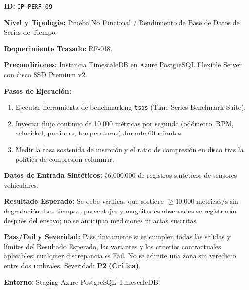\par\noindent\textbf{ID:} \texttt{C\allowbreak{}P\allowbreak{}-\allowbreak{}P\allowbreak{}E\allowbreak{}R\allowbreak{}F\allowbreak{}-\allowbreak{}0\allowbreak{}9\allowbreak{}}\par
\par\noindent\textbf{Nivel y Tipología:} Prueba No Funcional / Rendimiento de Base de Datos de Series de Tiempo.\par
\par\noindent\textbf{Requerimiento Trazado:} RF-018.\par
\par\noindent\textbf{Precondiciones:} Instancia TimescaleDB en Azure PostgreSQL Flexible Server con disco SSD Premium v2.\par
\par\noindent\textbf{Pasos de Ejecución:} \par
\begin{enumerate}
\item Ejecutar herramienta de benchmarking \texttt{t\allowbreak{}s\allowbreak{}b\allowbreak{}s\allowbreak{}} (Time Series Benchmark Suite).
\item Inyectar flujo continuo de 10.000 métricas por segundo (odómetro, RPM, velocidad, presiones, temperaturas) durante 60 minutos.
\item Medir la tasa sostenida de inserción y el ratio de compresión en disco tras la política de compresión columnar.
\end{enumerate}
\par\noindent\textbf{Datos de Entrada Sintéticos:} 36.000.000 de registros sintéticos de sensores vehiculares.\par
\par\noindent\textbf{Resultado Esperado:} Se debe verificar que sostiene \(\ge 10.000\text{ métricas/s}\) sin degradación. Los tiempos, porcentajes y magnitudes observados se registrarán después del ensayo; no se anticipan mediciones ni actas suscritas.\par
\par\noindent\textbf{Pass/Fail y Severidad:} Pass únicamente si se cumplen todas las salidas y límites del Resultado Esperado, las variantes y los criterios contractuales aplicables; cualquier discrepancia es Fail. No se admite una zona sin veredicto entre dos umbrales. Severidad: \textbf{P2 (Crítica)}.\par
\par\noindent\textbf{Entorno:} Staging Azure PostgreSQL TimescaleDB.\par







